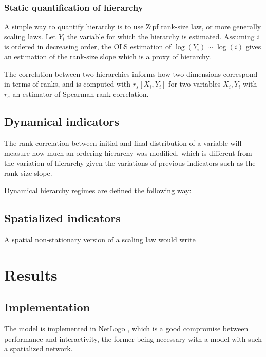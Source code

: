 \documentclass[english,fleqn,allpages]{ISTE_science}[2018/07/30]
\begin{document}
\subsubsection{Static quantification of hierarchy}

A simple way to quantify hierarchy is to use Zipf rank-size law, or more generally scaling laws. Let $Y_i$ the variable for which the hierarchy is estimated. Assuming $i$ is ordered in decreasing order, the OLS estimation of $\log \left(Y_i\right) \sim \log \left( i\right)$ gives an estimation of the rank-size slope which is a proxy of hierarchy.


The correlation between two hierarchies informs how two dimensions correspond in terms of ranks, and is computed with $r_s\left[X_i,Y_i\right]$ for two variables $X_i,Y_i$ with $r_s$ an estimator of Spearman rank correlation.


\subsection{Dynamical indicators}

The rank correlation between initial and final distribution of a variable will measure how much an ordering hierarchy was modified, which is different from the variation of hierarchy given the variations of previous indicators such as the rank-size slope.

Dynamical hierarchy regimes are defined the following way: 


\subsection{Spatialized indicators}

A spatial non-stationary version of a scaling law would write




\section{Results}


\subsection{Implementation}

The model is implemented in NetLogo \cite{tisue2004netlogo}, which is a good compromise between performance and interactivity, the former being necessary with a model with such a spatialized network. 
\end{document}
